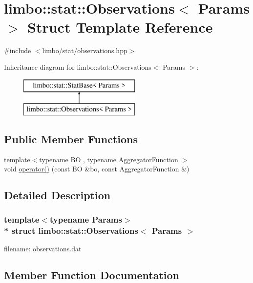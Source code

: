 \hypertarget{structlimbo_1_1stat_1_1_observations}{}\section{limbo\+:\+:stat\+:\+:Observations$<$ Params $>$ Struct Template Reference}
\label{structlimbo_1_1stat_1_1_observations}


{\ttfamily \#include $<$limbo/stat/observations.\+hpp$>$}

Inheritance diagram for limbo\+:\+:stat\+:\+:Observations$<$ Params $>$\+:\begin{figure}[H]
\begin{center}
\leavevmode
\includegraphics[height=2.000000cm]{structlimbo_1_1stat_1_1_observations}
\end{center}
\end{figure}
\subsection*{Public Member Functions}
\begin{DoxyCompactItemize}
\item 
{\footnotesize template$<$typename BO , typename Aggregator\+Function $>$ }\\void \hyperlink{structlimbo_1_1stat_1_1_observations_ad39d50d8d1b6e7e699bb2bc6c775d391}{operator()} (const BO \&bo, const Aggregator\+Function \&)
\end{DoxyCompactItemize}


\subsection{Detailed Description}
\subsubsection*{template$<$typename Params$>$\\*
struct limbo\+::stat\+::\+Observations$<$ Params $>$}

filename\+: {\ttfamily observations.\+dat} 

\subsection{Member Function Documentation}
